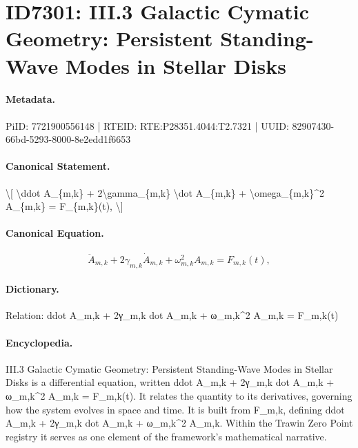 \section*{ID7301: III.3 Galactic Cymatic Geometry: Persistent Standing-Wave Modes in Stellar Disks}
\paragraph{Metadata.}
PiID: 7721900556148 | RTEID: RTE:P28351.4044:T2.7321 | UUID: 82907430-66bd-5293-8000-8e2edd1f6653

\paragraph{Canonical Statement.}
\textbackslash{}[ \textbackslash{}ddot A\_\{m,k\} + 2\textbackslash{}gamma\_\{m,k\} \textbackslash{}dot A\_\{m,k\} + \textbackslash{}omega\_\{m,k\}\textasciicircum{}2 A\_\{m,k\} = F\_\{m,k\}(t), \textbackslash{}]

\paragraph{Canonical Equation.}
\[
\ddot A_{m,k} + 2\gamma_{m,k} \dot A_{m,k} + \omega_{m,k}^2 A_{m,k} = F_{m,k}(t),
\]

\paragraph{Dictionary.}
Relation: ddot A\_m,k + 2γ\_m,k dot A\_m,k + ω\_m,k\textasciicircum{}2 A\_m,k = F\_m,k(t)

\paragraph{Encyclopedia.}
III.3 Galactic Cymatic Geometry: Persistent Standing-Wave Modes in Stellar Disks is a differential equation, written ddot A\_m,k + 2γ\_m,k dot A\_m,k + ω\_m,k\textasciicircum{}2 A\_m,k = F\_m,k(t). It relates the quantity to its derivatives, governing how the system evolves in space and time. It is built from F\_m,k, defining ddot A\_m,k + 2γ\_m,k dot A\_m,k + ω\_m,k\textasciicircum{}2 A\_m,k. Within the Trawin Zero Point registry it serves as one element of the framework's mathematical narrative.
